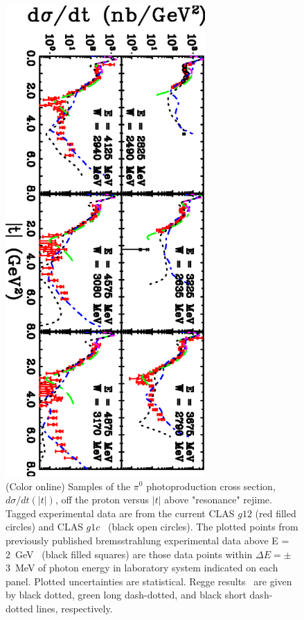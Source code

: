 \documentclass[aps,prc,onecolumn,floatfix,showpacs,preprintnumbers,amsmath,amssymb,superscriptaddress]{revtex4-1}
\begin{document}
\begin{figure}[htb!]
\centerline{
        \includegraphics[width=3in, angle=90]{dsdt.eps}}

        \caption {(Color online) Samples of the $\pi^0$ 
		photoproduction cross section, $d\sigma/dt(|t|)$, 
		off the proton versus $|t|$ above "resonance" 
		rejime.  Tagged experimental data are from the 
		current CLAS $g12$ (red filled circles) and CLAS 
		$g1c$~\protect\cite{du07} (black open circles). 
		The plotted points from previously published 
		bremsstrahlung experimental data above E = 
		2~GeV~\protect\cite{brem} (black filled squares) 
		are those data points within $\Delta E = \pm$3~MeV 
		of photon energy in laboratory system indicated on 
		each panel. Plotted uncertainties are statistical.  
		Regge results~\protect\cite{Goldstein,Mathieu,
		Donnachie} are given by black dotted, green 
		long dash-dotted, and black short dash-dotted
		lines, respectively.} \label{fig:t_data}
\end{figure}
\end{document}
